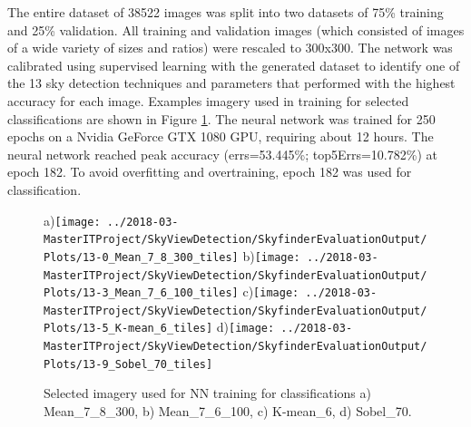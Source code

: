 \documentclass[final,3p,times,authoryear]{elsarticle}
\begin{document}
The entire dataset of 38522 images was split into two datasets of 75\% training and 25\% validation. All training and validation images (which consisted of images of a wide variety of sizes and ratios) were rescaled to 300x300. The network was calibrated using supervised learning with the generated dataset to identify one of the 13 sky detection techniques and parameters that performed with the highest accuracy for each image. Examples imagery used in training for selected classifications are shown in Figure \ref{fig:classImages}. The neural network was trained for 250 epochs on a Nvidia GeForce GTX 1080 GPU, requiring about 12 hours. The neural network reached peak accuracy (errs=53.445\%; top5Errs=10.782\%) at epoch 182. To avoid overfitting and overtraining, epoch 182 was used for classification.




\begin{figure}
\centering
a)\texttt{[image: ../2018-03-MasterITProject/SkyViewDetection/SkyfinderEvaluationOutput/Plots/13-0\_Mean\_7\_8\_300\_tiles]}
b)\texttt{[image: ../2018-03-MasterITProject/SkyViewDetection/SkyfinderEvaluationOutput/Plots/13-3\_Mean\_7\_6\_100\_tiles]}
c)\texttt{[image: ../2018-03-MasterITProject/SkyViewDetection/SkyfinderEvaluationOutput/Plots/13-5\_K-mean\_6\_tiles]}
d)\texttt{[image: ../2018-03-MasterITProject/SkyViewDetection/SkyfinderEvaluationOutput/Plots/13-9\_Sobel\_70\_tiles]}
\caption{Selected imagery used for NN training for classifications 
a) Mean\_7\_8\_300, 
b) Mean\_7\_6\_100, 
c) K-mean\_6, 
d) Sobel\_70.}
\label{fig:classImages}
\end{figure}
\end{document}
